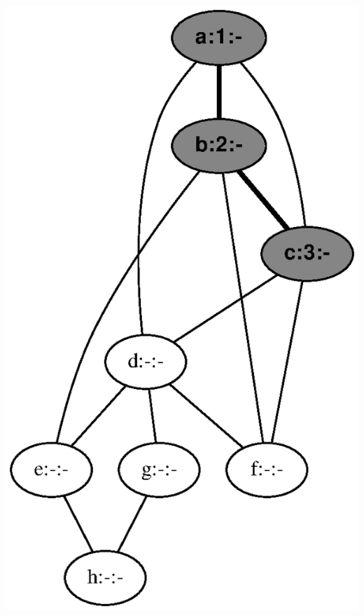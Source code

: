 \documentclass{article}
\begin{document}
\includegraphics[height=.3\textheight]{dfs_undirected_classroom_03.eps}
\vspace{1em}
\end{document}
